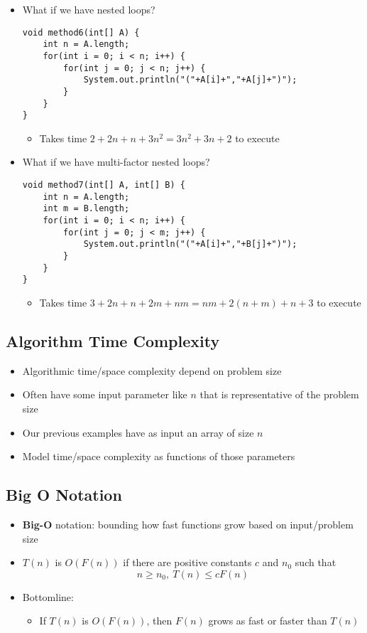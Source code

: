 \documentclass[10pt]{article}
\begin{document}
\begin{itemize}
\item What if we have nested loops?
\begin{verbatim}
void method6(int[] A) {
    int n = A.length;
    for(int i = 0; i < n; i++) {
        for(int j = 0; j < n; j++) {
            System.out.println("("+A[i]+","+A[j]+")");
        }
    }
}
\end{verbatim}
\begin{itemize}
    \item Takes time $2+2n+n+3n^2 = 3n^2 + 3n + 2$ to execute
\end{itemize}

\item What if we have multi-factor nested loops?
\begin{verbatim}
void method7(int[] A, int[] B) {
    int n = A.length;
    int m = B.length;
    for(int i = 0; i < n; i++) {
        for(int j = 0; j < m; j++) {
            System.out.println("("+A[i]+","+B[j]+")");
        }
    }
}
\end{verbatim}
\begin{itemize}
    \item Takes time $3+2n+n+2m+nm=nm+2(n+m)+n+3$ to execute
\end{itemize}
\end{itemize}

\subsection*{Algorithm Time Complexity}
\begin{itemize}
\item Algorithmic time/space complexity depend on problem size
\item Often have some input parameter like $n$ that is representative of the problem size
\item Our previous examples have as input an array of size $n$
\item Model time/space complexity as functions of those parameters
\end{itemize}

\subsection*{Big O Notation}
\begin{itemize}
\item \textbf{Big-O} notation: bounding how fast functions grow based on input/problem size
\item $T(n)$ is $O(F(n))$ if there are positive constants $c$ and $n_0$ such that$$n \geq n_0,\ T(n) \leq cF(n)$$
\item Bottomline:
\begin{itemize}
\item If $T(n)$ is $O(F(n))$, then $F(n)$ grows as fast or faster than $T(n)$
\end{itemize}
\end{itemize}
\end{document}
